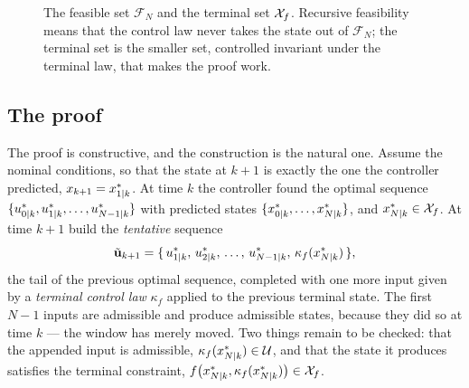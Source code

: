 \begin{figure}[t]
\centering
{}
\caption{The feasible set $\mathcal{F}_N$ and the terminal set $\mathcal{X}_f$. Recursive feasibility
means that the control law never takes the state out of $\mathcal{F}_N$; the terminal set is
the smaller set, controlled invariant under the terminal law, that makes the proof work.}
\label{fig:invariant}
\end{figure}

\subsection{The proof}

The proof is constructive, and the construction is the natural one. Assume the nominal
conditions, so that the state at $k+1$ is exactly the one the controller predicted,
$x_{k+1} = x^*_{{1|k}}$. At time $k$ the controller found the optimal sequence
$\{u^*_{{0|k}}, u^*_{{1|k}}, \dots, u^*_{{N-1|k}}\}$ with predicted states
$\{x^*_{{0|k}}, \dots, x^*_{{N|k}}\}$, and $x^*_{{N|k}} \in \mathcal{X}_f$. At time $k+1$ build the
\emph{tentative} sequence
\begin{equation}
  \tilde{\mathbf{u}}_{k+1} = \{\,u^*_{{1|k}},\, u^*_{{2|k}},\, \dots,\, u^*_{{N-1|k}},\,
  \kappa_f(x^*_{{N|k}})\,\},
  \label{eq:tail}
\end{equation}
the tail of the previous optimal sequence, completed with one more input given by a
\emph{terminal control law} $\kappa_f$ applied to the previous terminal state. The first $N-1$
inputs are admissible and produce admissible states, because they did so at time $k$ --- the
window has merely moved. Two things remain to be checked: that the appended input is
admissible, $\kappa_f(x^*_{{N|k}}) \in \mathcal{U}$, and that the state it produces satisfies the
terminal constraint, $f\big(x^*_{{N|k}}, \kappa_f(x^*_{{N|k}})\big) \in \mathcal{X}_f$.

